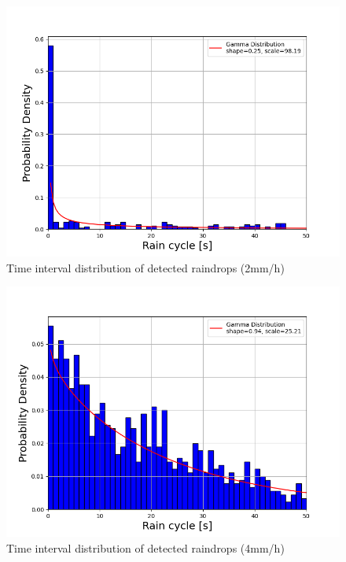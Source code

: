 \begin{figure}[H]
    \centering
    \includegraphics[keepaspectratio, scale=0.5]{images/png/3mm.png}
    \caption{Time interval distribution of detected raindrops (2mm/h)}
    \label{Fig:5.1}
\end{figure}

\begin{figure}[H]
    \centering
    \includegraphics[keepaspectratio, scale=0.5]{images/png/4mm.png}
    \caption{Time interval distribution of detected raindrops (4mm/h)}
    \label{Fig:5.2}
\end{figure}

